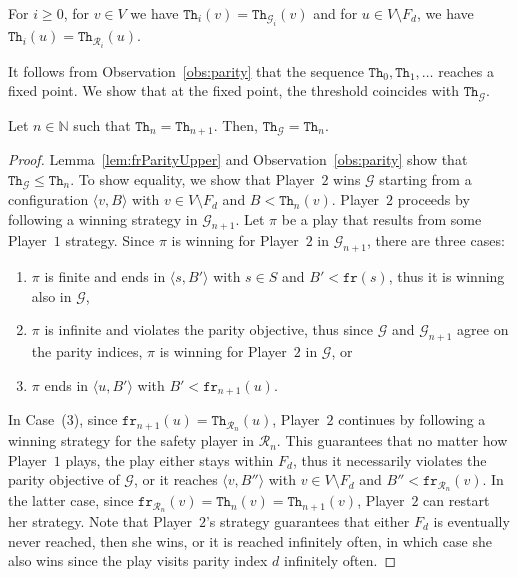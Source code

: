 \documentclass{theoretics}
\newcommand{\PO}{Player~$1$\xspace}
\newcommand{\PT}{Player~$2$\xspace}
\newcommand{\G}{{\mathcal G}}
\newcommand{\R}{{\mathcal R}}
\newcommand{\fr}{\texttt{fr}}
\newcommand{\Nat}{\mathbb{N}}
\newcommand{\notFd}{V \setminus F_d}
\newcommand{\thresh}{\texttt{Th}\xspace}
\newcommand{\zug}[1]{\langle #1  \rangle}
\begin{document}
\begin{lemma}
\label{lem:frParityUpper}
For $i \geq 0$, for $v \in V$ we have $\thresh_i(v) = \thresh_{\G_i}(v)$ and for $u \in \notFd$, we have $\thresh_i(u) = \thresh_{\R_i}(u)$. 
\end{lemma}


It follows from Observation~\ref{obs:parity} that the sequence $\thresh_0,\thresh_1,\ldots$ reaches a fixed point. We show that at the fixed point, the threshold coincides with $\thresh_\G$. 

\begin{lemma}
Let $n \in \Nat$ such that $\thresh_n = \thresh_{n+1}$. Then, $\thresh_\G = \thresh_n$. 
\end{lemma}
\begin{proof}
Lemma~\ref{lem:frParityUpper} and Observation~\ref{obs:parity} show that $\thresh_\G \leq \thresh_n$. To show equality, we show that \PT wins $\G$ starting from a configuration $\zug{v, B}$ with $v \in \notFd$ and $B < \thresh_n(v)$. \PT proceeds by following a winning strategy in $\G_{n+1}$. Let $\pi$ be a play that results from some \PO strategy. Since $\pi$ is winning for \PT in $\G_{n+1}$,  there are three cases: 
\begin{enumerate}
\item $\pi$ is finite and ends in $\zug{s, B'}$ with $s \in S$ and $B' < \fr(s)$, thus it is winning also in $\G$, 
\item $\pi$ is infinite and violates the parity objective, thus since $\G$ and $\G_{n+1}$ agree on the parity indices, $\pi$ is winning for \PT in $\G$, or 
\item $\pi$ ends in $\zug{u, B'}$ with $B' < \fr_{n+1}(u)$. 
\end{enumerate}
In Case~(3), since $\fr_{n+1}(u) = \thresh_{\R_n}(u)$, \PT continues by following a winning strategy for the safety player in $\R_n$. This guarantees that no matter how \PO plays, the play either stays within $F_d$, thus it necessarily violates the parity objective of $\G$, or it reaches $\zug{v, B''}$ with $v \in \notFd$ and $B'' < \fr_{\R_n}(v)$.  In the latter case, since $\fr_{\R_n}(v) = \thresh_n(v) = \thresh_{n+1}(v)$, \PT can restart her strategy. Note that \PT's strategy guarantees that either $F_d$ is eventually never reached, then she wins, or it is reached infinitely often, in which case she also wins since the play visits parity index $d$ infinitely often. 
\end{proof}
\end{document}
